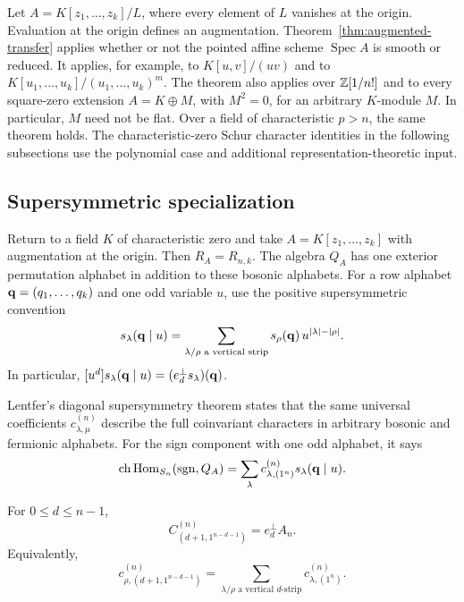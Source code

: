 \begin{example}
Let $A=K[z_1,\ldots,z_k]/L$, where every element of
$L$ vanishes at the origin.  Evaluation at the origin
defines an augmentation.
Theorem~\ref{thm:augmented-transfer} applies whether or
not the pointed affine scheme $\operatorname{Spec}A$
is smooth or reduced.  It applies, for example, to
$K[u,v]/(uv)$ and to $K[u_1,\ldots,u_k]/(u_1,\ldots,u_k)^m$.
The theorem also applies over $\mathbb Z[1/n!]$ and to every square-zero
extension $A=K\oplus M$, with $M^2=0$, for an arbitrary $K$-module
$M$.  In particular, $M$ need not be flat.  Over a field of
characteristic $p>n$, the same theorem holds.
The characteristic-zero Schur character identities in
the following subsections use the polynomial case and
additional representation-theoretic input.
\end{example}


\subsection{Supersymmetric specialization}
\label{sec:hook-identity}

Return to a field $K$ of characteristic zero and take
$A=K[z_1,\ldots,z_k]$ with augmentation at the origin.
Then $R_A=R_{n,k}$.
The algebra $Q_A$ has one exterior permutation alphabet in
addition to these bosonic alphabets.
For a row alphabet $\mathbf q=(q_1,\ldots,q_k)$ and one odd
variable $u$, use the positive supersymmetric convention
\begin{equation}\label{eq:superschur}
 s_\lambda(\mathbf q\mid u)
   =\sum_{\lambda/\rho\text{ a vertical strip}}
           s_\rho(\mathbf q)\,u^{|\lambda|-|\rho|}.
\end{equation}
In particular,
$[u^d]s_\lambda(\mathbf q\mid u)
     =(e_d^\perp s_\lambda)(\mathbf q)$.

Lentfer's diagonal supersymmetry theorem
\cite[Theorem~1.2 and Corollary~1.3]{Lentfer}
states that the same universal coefficients
$c_{\lambda,\mu}^{(n)}$ describe the full coinvariant
characters in arbitrary bosonic and fermionic alphabets.
For the sign component with one odd alphabet, it says
\begin{equation}\label{eq:lentfer-sign}
 \operatorname{ch}\operatorname{Hom}_{S_n}(\operatorname{sgn},Q_A)
       =\sum_\lambda
          c_{\lambda,(1^n)}^{(n)}s_\lambda(\mathbf q\mid u).
\end{equation}

\begin{theorem}\label{thm:full-hook}
For $0\leq d\leq n-1$,
\begin{equation}\label{eq:full-hook}
 C_{(d+1,1^{n-d-1})}^{(n)}=e_d^\perp A_n.
\end{equation}
Equivalently,
\[
 c_{\rho,(d+1,1^{n-d-1})}^{(n)}
   =\sum_{\lambda/\rho\text{ a vertical }d\text{-strip}}
          c_{\lambda,(1^n)}^{(n)}.
\]
\end{theorem}

